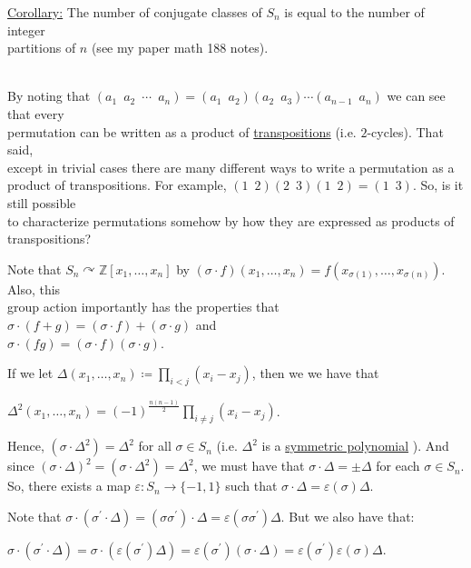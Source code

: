 \documentclass{book}
\newcommand{\hTwo}{%
\color{Black}%
   \fontsize{13}{15}\selectfont%
}
\newcommand{\udefine}[1]{{%
   \setulcolor{Red}%
   \setul{0.14em}{0.07em}%
   \ul{#1}%
}}
\newcommand{\gap}{\phantom{2}}
\newcommand{\mySepTwo}[1][.]{%
   {\noindent\color{#1}{\rule{6.5in}{0.5mm}}}\\%
}
\newcommand{\retTwo}{\hfill\bigbreak}
\begin{document}
\ul{Corollary:} The number of conjugate classes of $S_n$ is equal to the number of integer\\ partitions of $n$ (see my paper math 188 notes).

\hTwo\mySepTwo

By noting that $(a_1\gap a_2 \gap \cdots \gap a_n) = (a_1\gap a_2)(a_2 \gap a_3)\cdots (a_{n-1}\gap a_n)$ we can see that every\\ permutation can be written as a product of \udefine{transpositions} (i.e. $2$-cycles). That said,\\ except in trivial cases there are many different ways to write a permutation as a\\ product of transpositions. For example, $(1\gap 2)(2 \gap 3)(1 \gap 2) = (1 \gap 3)$. So, is it still possible\\ to characterize permutations somehow by how they are expressed as products of\\ transpositions?\retTwo

Note that $S_n \curvearrowright \mathbb{Z}[x_1, \ldots, x_n]$ by $(\sigma \cdot f)(x_1, \ldots, x_n) = f(x_{\sigma(1)},\ldots, x_{\sigma(n)})$. Also, this\\ group action importantly has the properties that $\sigma \cdot (f + g) = (\sigma \cdot f) + (\sigma \cdot g)$ and\\ $\sigma \cdot (fg) = (\sigma \cdot f)(\sigma \cdot g)$.\retTwo

If we let $\Delta(x_1, \ldots, x_n) \coloneqq \prod_{i < j} (x_i - x_j)$, then we we have that

{\centering$\Delta^2(x_1, \ldots, x_n) = (-1)^{\frac{n(n-1)}{2}} \prod_{i \neq j}(x_i - x_j)$.\retTwo\par}

Hence, $(\sigma \cdot \Delta^2) = \Delta^2$ for all $\sigma \in S_n$ (i.e. $\Delta^2$ is a \udefine{symmetric polynomial}). And since $(\sigma \cdot \Delta)^2 = (\sigma \cdot \Delta^2) = \Delta^2$, we must have that $\sigma \cdot \Delta = \pm \Delta$ for each $\sigma \in S_n$. So, there exists a map $\varepsilon : S_n \to \{-1, 1\}$ such that $\sigma \cdot \Delta = \varepsilon(\sigma) \Delta$.\retTwo

Note that $\sigma \cdot (\sigma^\prime \cdot \Delta) = (\sigma \sigma^\prime) \cdot \Delta = \varepsilon(\sigma \sigma^\prime) \Delta$. But we also have that:

{\centering $\sigma \cdot (\sigma^\prime \cdot \Delta) = \sigma \cdot (\varepsilon(\sigma^\prime)\Delta) = \varepsilon(\sigma^\prime) (\sigma \cdot \Delta) = \varepsilon(\sigma^\prime)\varepsilon(\sigma)\Delta$. \retTwo\par}
\end{document}
